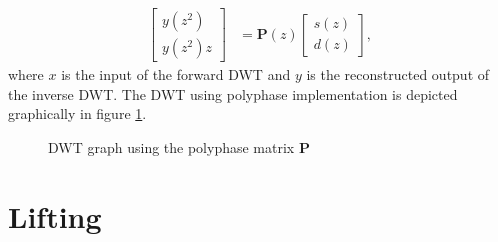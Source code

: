 \begin{refsection}
\begin{align}
\\
\begin{bmatrix}
	y(z^2) \\
	y(z^2) z
\end{bmatrix}
&=
\bm P(z)
\begin{bmatrix}
	s(z) \\
	d(z)
\end{bmatrix}
,
\end{align}
where $x$ is the input of the forward DWT and $y$ is the reconstructed output of the inverse DWT.
The DWT using polyphase implementation is depicted graphically in figure \ref{fpga:fig:liftingSteps}.
\begin{figure}
	\centering
	
	\caption{DWT graph using the polyphase matrix $\bm P$}
	\label{fpga:fig:liftingSteps}
\end{figure}

\section{Lifting}


\end{refsection}
